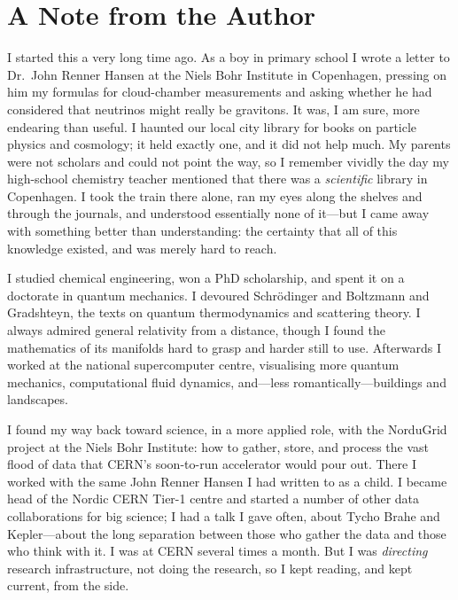 \chapter*{A Note from the Author}

I started this a very long time ago. As a boy in primary school I wrote a letter
to Dr.\ John Renner Hansen at the Niels Bohr Institute in Copenhagen, pressing on
him my formulas for cloud-chamber measurements and asking whether he had
considered that neutrinos might really be gravitons. It was, I am sure, more
endearing than useful. I haunted our local city library for books on particle
physics and cosmology; it held exactly one, and it did not help much. My parents
were not scholars and could not point the way, so I remember vividly the day my
high-school chemistry teacher mentioned that there was a \emph{scientific} library
in Copenhagen. I took the train there alone, ran my eyes along the shelves and
through the journals, and understood essentially none of it---but I came away with
something better than understanding: the certainty that all of this knowledge
existed, and was merely hard to reach.

I studied chemical engineering, won a PhD scholarship, and spent it on a doctorate
in quantum mechanics. I devoured Schr\"odinger and Boltzmann and Gradshteyn, the
texts on quantum thermodynamics and scattering theory. I always admired general
relativity from a distance, though I found the mathematics of its manifolds hard
to grasp and harder still to use. Afterwards I worked at the national
supercomputer centre, visualising more quantum mechanics, computational fluid
dynamics, and---less romantically---buildings and landscapes.

I found my way back toward science, in a more applied role, with the NorduGrid
project at the Niels Bohr Institute: how to gather, store, and process the vast
flood of data that CERN's soon-to-run accelerator would pour out. There I worked
with the same John Renner Hansen I had written to as a child. I became head of the
Nordic CERN Tier-1 centre and started a number of other data collaborations for
big science; I had a talk I gave often, about Tycho Brahe and Kepler---about the
long separation between those who gather the data and those who think with it. I
was at CERN several times a month. But I was \emph{directing} research
infrastructure, not doing the research, so I kept reading, and kept current, from
the side.

